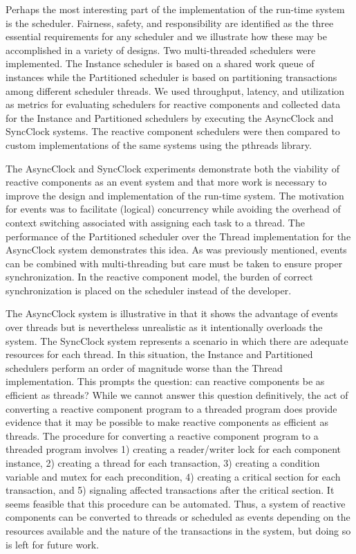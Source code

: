 Perhaps the most interesting part of the implementation of the \rcgo{} run-time system is the scheduler.
Fairness, safety, and responsibility are identified as the three essential requirements for any scheduler and we illustrate how these may be accomplished in a variety of designs.
Two multi-threaded schedulers were implemented.
The Instance scheduler is based on a shared work queue of instances while the Partitioned scheduler is based on partitioning transactions among different scheduler threads.
We used throughput, latency, and utilization as metrics for evaluating schedulers for reactive components and collected data for the Instance and Partitioned schedulers by executing the AsyncClock and SyncClock systems.
The reactive component schedulers were then compared to custom implementations of the same systems using the pthreads library.

The AsyncClock and SyncClock experiments demonstrate both the viability of reactive components as an event system and that more work is necessary to improve the design and implementation of the run-time system.
The motivation for events was to facilitate (logical) concurrency while avoiding the overhead of context switching associated with assigning each task to a thread.
The performance of the Partitioned scheduler over the Thread implementation for the AsyncClock system demonstrates this idea.
As was previously mentioned, events can be combined with multi-threading but care must be taken to ensure proper synchronization.
In the reactive component model, the burden of correct synchronization is placed on the scheduler instead of the developer.

The AsyncClock system is illustrative in that it shows the advantage of events over threads but is nevertheless unrealistic as it intentionally overloads the system.
The SyncClock system represents a scenario in which there are adequate resources for each thread.
In this situation, the Instance and Partitioned schedulers perform an order of magnitude worse than the Thread implementation.
This prompts the question:  can reactive components be as efficient as threads?
While we cannot answer this question definitively, the act of converting a reactive component program to a threaded program does provide evidence that it may be possible to make reactive components as efficient as threads.
The procedure for converting a reactive component program to a threaded program involves 1) creating a reader/writer lock for each component instance, 2) creating a thread for each transaction, 3) creating a condition variable and mutex for each precondition, 4) creating a critical section for each transaction, and 5) signaling affected transactions after the critical section.
It seems feasible that this procedure can be automated.
Thus, a system of reactive components can be converted to threads or scheduled as events depending on the resources available and the nature of the transactions in the system, but doing so is left for future work.

